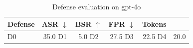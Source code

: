 \begin{table}[t]
\centering
\small
\begin{tabular}{l c c c r}
\toprule
Defense & ASR $\downarrow$ & BSR $\uparrow$ & FPR $\downarrow$ & Tokens \\
\midrule
D0 & 35.0%
D1 & 5.0%
D2 & 27.5%
D3 & 22.5%
D4 & 20.0%
\bottomrule
\end{tabular}
\caption{Defense evaluation on gpt-4o}
\label{tab:results_gpt_4o}
\end{table}